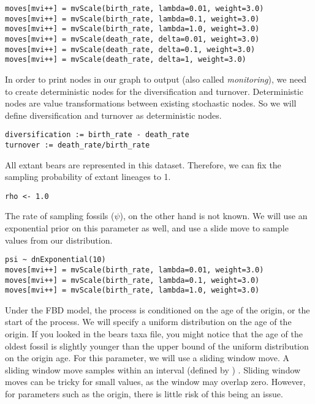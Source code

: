 {\tt \begin{snugshade*}
\begin{lstlisting}
moves[mvi++] = mvScale(birth_rate, lambda=0.01, weight=3.0)
moves[mvi++] = mvScale(birth_rate, lambda=0.1, weight=3.0)
moves[mvi++] = mvScale(birth_rate, lambda=1.0, weight=3.0)
moves[mvi++] = mvScale(death_rate, delta=0.01, weight=3.0)
moves[mvi++] = mvScale(death_rate, delta=0.1, weight=3.0)
moves[mvi++] = mvScale(death_rate, delta=1, weight=3.0)
\end{lstlisting}
\end{snugshade*}}

In order to print nodes in our graph to output (also called \textit{monitoring}), we need to create deterministic nodes for the diversification and turnover. Deterministic nodes are value transformations between existing stochastic nodes. So we will define diversification and turnover as deterministic nodes.

{\tt \begin{snugshade*}
\begin{lstlisting}
diversification := birth_rate - death_rate
turnover := death_rate/birth_rate
\end{lstlisting}
\end{snugshade*}}

All extant bears are represented in this dataset. Therefore, we can fix the sampling probability of extant lineages to 1.

{\tt \begin{snugshade*}
\begin{lstlisting}
rho <- 1.0
\end{lstlisting}
\end{snugshade*}}

The rate of sampling fossils ($\psi$), on the other hand is not known. We will use an exponential prior on this parameter as well, and use a slide move to sample values from our distribution.

{\tt \begin{snugshade*}
\begin{lstlisting}
psi ~ dnExponential(10) 
moves[mvi++] = mvScale(birth_rate, lambda=0.01, weight=3.0)
moves[mvi++] = mvScale(birth_rate, lambda=0.1, weight=3.0)
moves[mvi++] = mvScale(birth_rate, lambda=1.0, weight=3.0)
\end{lstlisting}
\end{snugshade*}}

Under the FBD model, the process is conditioned on the age of the origin, or the start of the process. 
We will specify a uniform distribution on the age of the origin. If you looked in the bears taxa file, you might notice that the age of the oldest fossil is slightly younger than the upper bound of the uniform distribution on the origin age. 
For this parameter, we will use a sliding window move. A sliding window move samples within an interval (defined by ) . Sliding window moves can be tricky for small values, as the window may overlap zero. However, for parameters such as the origin, there is little risk of this being an issue.

